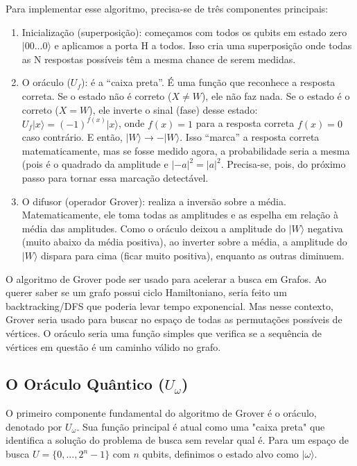 \documentclass[12pt, a4paper]{article}
\newcommand{\ket}[1]{\lvert #1 \rangle}
\begin{document}
Para implementar esse algoritmo, precisa-se de três componentes principais:
\begin{enumerate}[label=\Alph*.]
    \item Inicialização (superposição): começamos com todos os qubits em estado zero $\ket{00...0}$ e aplicamos a porta H a todos. Isso cria uma superposição onde todas as N respostas possíveis têm a mesma chance de serem medidas.
    \item O oráculo ($U_f$): é a ``caixa preta''. É uma função que reconhece a resposta correta. Se o estado não é correto ($X \ne W$), ele não faz nada. Se o estado é o correto ($X = W$), ele inverte o sinal (fase) desse estado: $U_f\ket{x} = (-1)^{f(x)}\ket{x}$, onde $f(x) = 1$ para a resposta correta $f(x) = 0$ caso contrário. E então, $\ket{W} \longrightarrow -\ket{W}$. Isso ``marca'' a resposta correta matematicamente, mas se fosse medido agora, a probabilidade seria a mesma (pois é o quadrado da amplitude e $|-a|^2 = |a|^2$. Precisa-se, pois, do próximo passo para tornar essa marcação detectável.
    \item O difusor (operador Grover): realiza a inversão sobre a média. Matematicamente, ele toma todas as amplitudes e as espelha em relação à média das amplitudes. Como o oráculo deixou a amplitude do $\ket{W}$ negativa (muito abaixo da média positiva), ao inverter sobre a média, a amplitude do $\ket{W}$ dispara para cima (ficar muito positiva), enquanto as outras diminuem.
\end{enumerate}

O algoritmo de Grover pode ser usado para acelerar a busca em Grafos. Ao querer saber se um grafo possui ciclo Hamiltoniano, seria feito um backtracking/DFS que poderia levar tempo exponencial. Mas nesse contexto, Grover seria usado para buscar no espaço de todas as permutações possíveis de vértices. O oráculo seria uma função simples que verifica se a sequência de vértices em questão é um caminho válido no grafo.

\subsection{O Oráculo Quântico ($U_\omega$)}

O primeiro componente fundamental do algoritmo de Grover é o oráculo, denotado por $U_\omega$. Sua função principal é atual como uma "caixa preta" que identifica a solução do problema de busca sem revelar qual é. Para um espaço de busca $U = \{0, ..., 2^n-1\}$ com $n$ qubits, definimos o estado alvo como $\ket{\omega}$.
\end{document}
